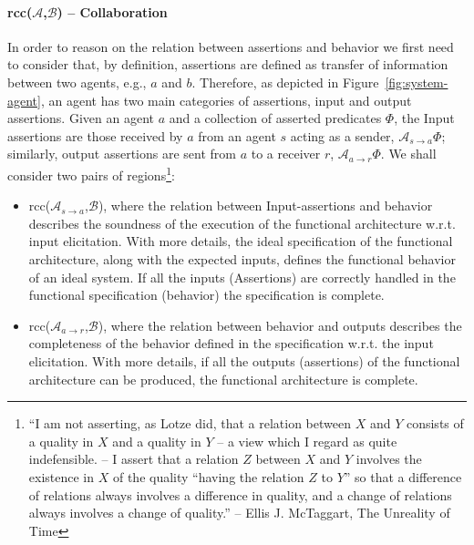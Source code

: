 \documentclass[conference]{IEEEtran}
\newcommand{\assertionRegion}{\mathcal{A}}
\newcommand{\beliefRegion}{\mathcal{B}}
\newcommand{\Rcc}[2]{rcc(#1,#2)}
\newcommand{\rassert}[3]{\mathcal{A}_{#1\rightarrow #2}#3}
\begin{document}
\paragraph{\Rcc{$\assertionRegion$}{$\beliefRegion$} -- Collaboration} In order
to reason on the relation between assertions and behavior we first need to
consider that, by definition, assertions are defined as transfer of information
between two agents, e.g., $a$ and $b$.  Therefore, as depicted in
Figure~\ref{fig:system-agent}, an agent has two main categories of assertions,
input and output assertions.  Given an agent $a$ and a collection of asserted
predicates $\Phi$, the Input assertions are those received by $a$ from an agent
$s$ acting as a sender, $\rassert{s}{a}{\Phi}$; similarly, output assertions
are sent from $a$ to a receiver $r$, $\rassert{a}{r}{\Phi}$. We shall consider
two pairs of regions\footnote{``I am not asserting, as Lotze did, that a
relation between $X$ and $Y$ consists of a quality in $X$ and a quality in $Y$
-- a view which I regard as quite indefensible. -- I assert that a relation $Z$
between $X$ and $Y$ involves the existence in $X$ of the quality ``having the
relation $Z$ to $Y$'' so that a difference of relations always involves a
difference in quality, and a change of relations always involves a change of
quality.'' --  Ellis J. McTaggart, The Unreality of
Time\autocite{Mctaggart1908unreality}}: 
\begin{itemize}
	\item \Rcc{$\assertionRegion_{s\rightarrow a}$}{$\beliefRegion$},
		where the relation between Input-assertions and behavior
		describes the soundness of the execution of the functional
		architecture w.r.t. input elicitation. With more details, the
		ideal specification of the functional architecture, along with
		the expected inputs, defines the functional behavior of an
		ideal system.  If all the inputs (Assertions) are correctly
		handled in the functional specification (behavior) the
		specification is complete. 

	\item \Rcc{$\assertionRegion_{a\rightarrow r}$}{$\beliefRegion$},
		where the relation between behavior and outputs describes the
		completeness of the behavior defined in the specification
		w.r.t. the input elicitation.  With more details, if all the
		outputs (assertions) of the functional architecture can be
		produced, the functional architecture is complete.
\end{itemize}
\end{document}
